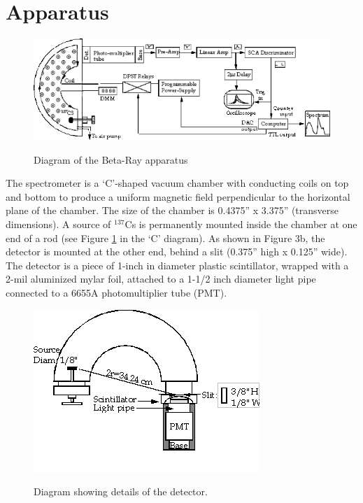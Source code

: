 \documentclass{../lab}
\begin{document}
\section{Apparatus}

\begin{figure}[h]
    \centering
    \href{http://experimentationlab.berkeley.edu/sites/default/files/images/600px-BRAimage010.gif}{\includegraphics[width=0.5\linewidth]{images/600px-BRAimage010.png}}
    \caption{Diagram of the Beta-Ray apparatus}
    \label{fig:DiagramOfBetaRayApparatus}
\end{figure}

The spectrometer is a `C'-shaped vacuum chamber with conducting coils on top and bottom to produce a uniform magnetic field perpendicular to the horizontal plane of the chamber. The size of the chamber is 0.4375'' x 3.375'' (transverse dimensions). A source of $^{137}$Cs is permanently mounted inside the chamber at one end of a rod (see Figure \ref{fig:DiagramOfBetaRayApparatus} in the `C' diagram). As shown in Figure 3b, the detector is mounted at the other end, behind a slit (0.375'' high x 0.125'' wide). The detector is a piece of 1-inch in diameter plastic scintillator, wrapped with a 2-mil aluminized mylar foil, attached to a 1-1/2 inch diameter light pipe connected to a 6655A photomultiplier tube (PMT).

\begin{figure}[h]
    \centering
    \href{http://experimentationlab.berkeley.edu/sites/default/files/images/BRAimage011.gif}{\includegraphics[width=0.5\linewidth]{images/BRAimage011.png}}
    \caption{Diagram showing details of the detector.}
    \label{fig:BRAimage011}
\end{figure}
\end{document}
